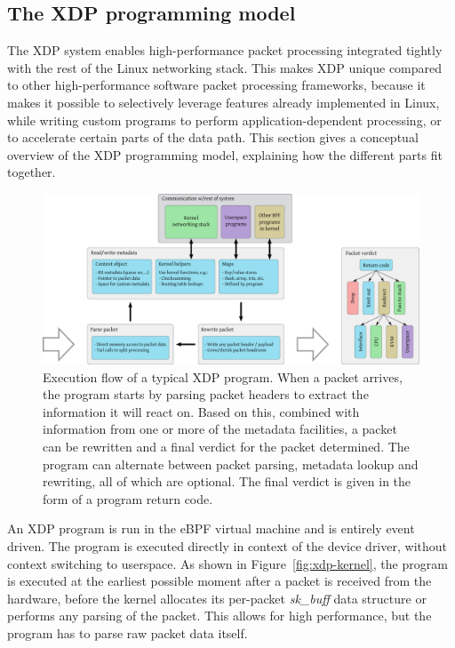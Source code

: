 \documentclass[10pt,sigconf]{acmart}
\begin{document}
\subsection{The XDP programming model}
\label{sec:prog-model}
The XDP system enables high-performance packet processing integrated tightly
with the rest of the Linux networking stack. This makes XDP unique compared to
other high-performance software packet processing frameworks, because it makes
it possible to selectively leverage features already implemented in Linux, while
writing custom programs to perform application-dependent processing, or to
accelerate certain parts of the data path. This section gives a conceptual
overview of the XDP programming model, explaining how the different parts fit
together.

\begin{figure}[t]
\centering
\includegraphics[width=\linewidth]{figures/xdp-execution-diagram.pdf}
\caption{\label{fig:xdp-execution} Execution flow of a typical XDP program. When
  a packet arrives, the program starts by parsing packet headers to extract the
  information it will react on. Based on this, combined with information from
  one or more of the metadata facilities, a packet can be rewritten and a final
  verdict for the packet determined. The program can alternate between packet
  parsing, metadata lookup and rewriting, all of which are optional. The final
  verdict is given in the form of a program return code.}
\end{figure}


An XDP program is run in the eBPF virtual machine and is entirely event driven.
The program is executed directly in context of the device driver, without
context switching to userspace. As shown in Figure~\ref{fig:xdp-kernel}, the
program is executed at the earliest possible moment after a packet is received
from the hardware, before the kernel allocates its per-packet \emph{sk\_buff}
data structure or performs any parsing of the packet. This allows for high
performance, but the program has to parse raw packet data itself.
\end{document}
